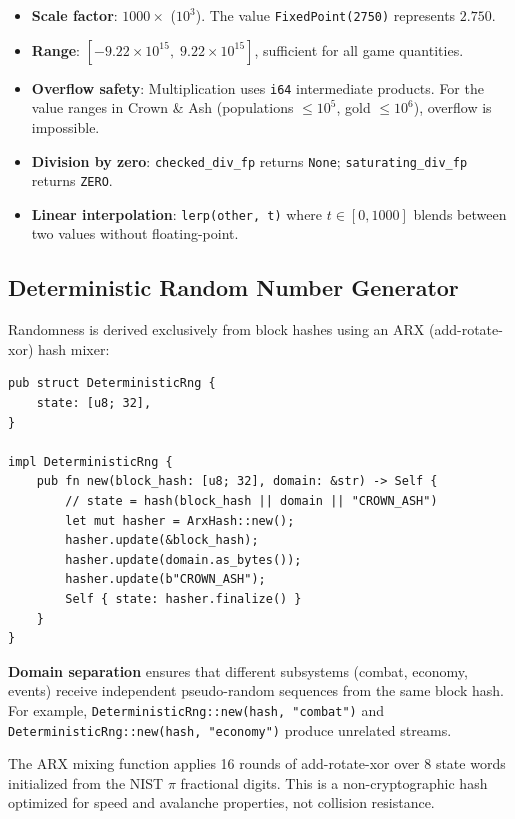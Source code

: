 \documentclass[a4paper, 11pt]{article}
\begin{document}
\begin{itemize}
  \item \textbf{Scale factor}: $1000\times$ ($10^3$). The value
    \texttt{FixedPoint(2750)} represents $2.750$.
  \item \textbf{Range}: $[-9.22 \times 10^{15},\; 9.22 \times 10^{15}]$,
    sufficient for all game quantities.
  \item \textbf{Overflow safety}: Multiplication uses \texttt{i64} intermediate
    products. For the value ranges in Crown \& Ash (populations $\leq 10^5$,
    gold $\leq 10^6$), overflow is impossible.
  \item \textbf{Division by zero}: \texttt{checked\_div\_fp} returns
    \texttt{None}; \texttt{saturating\_div\_fp} returns \texttt{ZERO}.
  \item \textbf{Linear interpolation}: \texttt{lerp(other, t)} where
    $t \in [0, 1000]$ blends between two values without floating-point.
\end{itemize}

\subsection{Deterministic Random Number Generator}
\label{sec:rng}

Randomness is derived exclusively from block hashes using an ARX
(add-rotate-xor) hash mixer:

\begin{lstlisting}[caption={Deterministic RNG construction.}]
pub struct DeterministicRng {
    state: [u8; 32],
}

impl DeterministicRng {
    pub fn new(block_hash: [u8; 32], domain: &str) -> Self {
        // state = hash(block_hash || domain || "CROWN_ASH")
        let mut hasher = ArxHash::new();
        hasher.update(&block_hash);
        hasher.update(domain.as_bytes());
        hasher.update(b"CROWN_ASH");
        Self { state: hasher.finalize() }
    }
}
\end{lstlisting}

\textbf{Domain separation} ensures that different subsystems (combat, economy,
events) receive independent pseudo-random sequences from the same block hash.
For example, \texttt{DeterministicRng::new(hash, "combat")} and
\texttt{DeterministicRng::new(hash, "economy")} produce unrelated streams.

The ARX mixing function applies 16 rounds of add-rotate-xor over 8 state
words initialized from the NIST $\pi$ fractional digits. This is a
non-cryptographic hash optimized for speed and avalanche properties, not
collision resistance.
\end{document}
